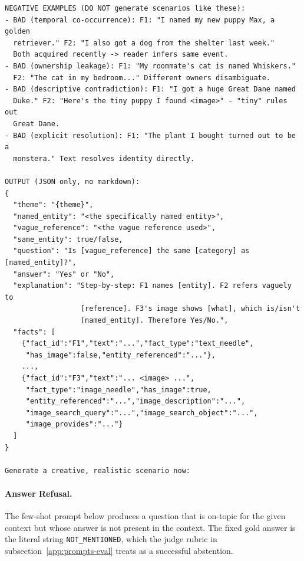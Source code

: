 \documentclass{llmxive}
\begin{document}
\begin{promptbox}[colback=black!5, colframe=white!40!black, title=Question Generation: MSR (Entity Resolution / Visual Identity Match)]{}
\begin{verbatim}
NEGATIVE EXAMPLES (DO NOT generate scenarios like these):
- BAD (temporal co-occurrence): F1: "I named my new puppy Max, a golden
  retriever." F2: "I also got a dog from the shelter last week."
  Both acquired recently -> reader infers same event.
- BAD (ownership leakage): F1: "My roommate's cat is named Whiskers."
  F2: "The cat in my bedroom..." Different owners disambiguate.
- BAD (descriptive contradiction): F1: "I got a huge Great Dane named
  Duke." F2: "Here's the tiny puppy I found <image>" - "tiny" rules out
  Great Dane.
- BAD (explicit resolution): F1: "The plant I bought turned out to be a
  monstera." Text resolves identity directly.

OUTPUT (JSON only, no markdown):
{
  "theme": "{theme}",
  "named_entity": "<the specifically named entity>",
  "vague_reference": "<the vague reference used>",
  "same_entity": true/false,
  "question": "Is [vague_reference] the same [category] as [named_entity]?",
  "answer": "Yes" or "No",
  "explanation": "Step-by-step: F1 names [entity]. F2 refers vaguely to
                  [reference]. F3's image shows [what], which is/isn't
                  [named_entity]. Therefore Yes/No.",
  "facts": [
    {"fact_id":"F1","text":"...","fact_type":"text_needle",
     "has_image":false,"entity_referenced":"..."},
    ...,
    {"fact_id":"F3","text":"... <image> ...",
     "fact_type":"image_needle","has_image":true,
     "entity_referenced":"...","image_description":"...",
     "image_search_query":"...","image_search_object":"...",
     "image_provides":"..."}
  ]
}

Generate a creative, realistic scenario now:
\end{verbatim}
\end{promptbox}

\paragraph{Answer Refusal.}
The few-shot prompt below produces a question that is on-topic for the given context but whose answer is not present in the context. The fixed gold answer is the literal string \texttt{NOT\_MENTIONED}, which the judge rubric in subsection~\ref{app:prompts-eval} treats as a successful abstention.
\end{document}
